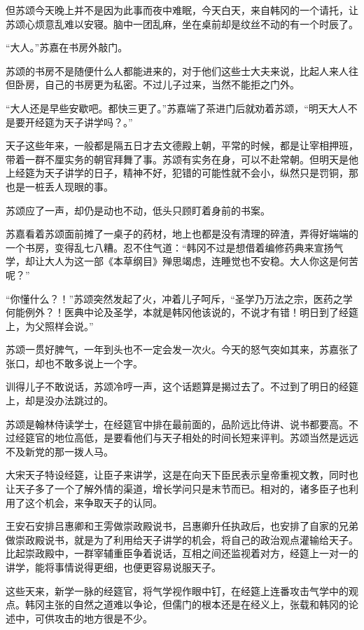 但苏颂今天晚上并不是因为此事而夜中难眠，今天白天，来自韩冈的一个请托，让苏颂心烦意乱难以安寝。脑中一团乱麻，坐在桌前却是纹丝不动的有一个时辰了。

“大人。”苏嘉在书房外敲门。

苏颂的书房不是随便什么人都能进来的，对于他们这些士大夫来说，比起人来人往但卧房，自己的书房更为私密。不过儿子过来，当然不能拒之门外。

“大人还是早些安歇吧。都快三更了。”苏嘉端了茶进门后就劝着苏颂，“明天大人不是要开经筵为天子讲学吗？。”

天子这些年来，一般都是隔五日才去文德殿上朝，平常的时候，都是让宰相押班，带着一群不厘实务的朝官拜舞了事。苏颂有实务在身，可以不赴常朝。但明天是他上经筵为天子讲学的日子，精神不好，犯错的可能性就不会小，纵然只是罚铜，那也是一桩丢人现眼的事。

苏颂应了一声，却仍是动也不动，低头只顾盯着身前的书案。

苏嘉看着苏颂面前摊了一桌子的药材，地上也都是没有清理的碎渣，弄得好端端的一个书房，变得乱七八糟。忍不住气道：“韩冈不过是想借着编修药典来宣扬气学，却让大人为这一部《本草纲目》殚思竭虑，连睡觉也不安稳。大人你这是何苦呢？”

“你懂什么？！”苏颂突然发起了火，冲着儿子呵斥，“圣学乃万法之宗，医药之学何能例外？！医典中论及圣学，本就是韩冈他该说的，不说才有错！明日到了经筵上，为父照样会说。”

苏颂一贯好脾气，一年到头也不一定会发一次火。今天的怒气突如其来，苏嘉张了张口，却也不敢多说上一个字。

训得儿子不敢说话，苏颂冷哼一声，这个话题算是揭过去了。不过到了明日的经筵上，却是没办法跳过的。

苏颂是翰林侍读学士，在经筵官中排在最前面的，品阶远比侍讲、说书都要高。不过经筵官的地位高低，是要看他们与天子相处的时间长短来评判。苏颂当然是远远不及新党的那一拨人马。

大宋天子特设经筵，让臣子来讲学，这是在向天下臣民表示皇帝重视文教，同时也让天子多了一个了解外情的渠道，增长学问只是末节而已。相对的，诸多臣子也利用了这个机会，来争取天子的认同。

王安石安排吕惠卿和王雱做崇政殿说书，吕惠卿升任执政后，也安排了自家的兄弟做崇政殿说书，就是为了利用给天子讲学的机会，将自己的政治观点灌输给天子。比起崇政殿中，一群宰辅重臣争着说话，互相之间还监视着对方，经筵上一对一的讲学，能将事情说得更细，也便更容易说服天子。

这些天来，新学一脉的经筵官，将气学视作眼中钉，在经筵上连番攻击气学中的观点。韩冈主张的自然之道难以争论，但儒门的根本还是在经义上，张载和韩冈的论述中，可供攻击的地方很是不少。

